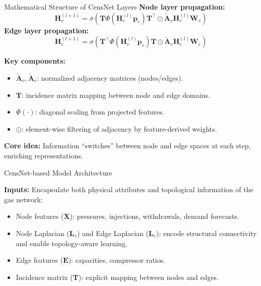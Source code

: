 \documentclass[hyperref={colorlinks,citecolor=blue,linkcolor=blue,urlcolor=blue}]{beamer}
\begin{document}
\begin{frame}{Mathematical Structure of CensNet Layers}
\footnotesize
\textbf{Node layer propagation:}
\[
\mathbf{H}^{(l+1)}_v = \sigma\left(
\mathbf{T} \Phi(\mathbf{H}^{(l)}_e \mathbf{p}_e) \mathbf{T}^\top 
\odot \tilde{\mathbf{A}}_v \mathbf{H}^{(l)}_v \mathbf{W}_v
\right)
\]
\textbf{Edge layer propagation:}
\[
\mathbf{H}^{(l+1)}_e = \sigma\left(
\mathbf{T}^\top \Phi(\mathbf{H}^{(l)}_v \mathbf{p}_v) \mathbf{T} 
\odot \tilde{\mathbf{A}}_e \mathbf{H}^{(l)}_e \mathbf{W}_e
\right)
\]

\medskip
\textbf{Key components:}
\begin{itemize}
    \item \( \tilde{\mathbf{A}}_v, \tilde{\mathbf{A}}_e \): normalized adjacency matrices (nodes/edges).
    \item \( \mathbf{T} \): incidence matrix mapping between node and edge domains.
    \item \( \Phi(\cdot) \): diagonal scaling from projected features.
    \item \( \odot \): element-wise filtering of adjacency by feature-derived weights.
\end{itemize}

\medskip
\textbf{Core idea:} Information “switches” between node and edge spaces at each step, enriching representations.
\end{frame}

\begin{frame}{CensNet-based Model Architecture}
\footnotesize
\justifying
    \centering
    \resizebox{0.9\textwidth}{!}{%
    } 

\textbf{Inputs:} Encapsulate both physical attributes and topological information of the gas network:
        \begin{itemize}
            \item Node features ($\mathbf{X}$): pressures, injections, withdrawals, demand forecasts.
            \item Node Laplacian ($\mathbf{L}_v$) and Edge Laplacian ($\mathbf{L}_e$): encode structural connectivity and enable topology-aware learning.
            \item Edge features ($\mathbf{E}$): capacities, compressor ratios.
            \item Incidence matrix ($\mathbf{T}$): explicit mapping between nodes and edges.
        \end{itemize} 
\end{frame}
\end{document}
